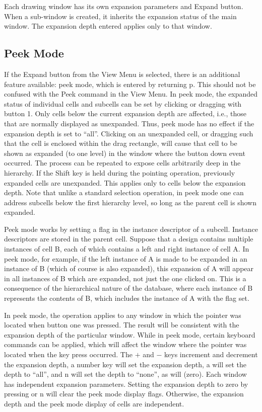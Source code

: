 Each drawing window has its own expansion parameters and {\cb Expand}
button.  When a sub-window is created, it inherits the expansion status
of the main window.  The expansion depth entered applies only to that
window. 

\subsection{Peek Mode}
If the {\cb Expand} button from the {\cb View Menu} is selected, there
is an additional feature available:  peek mode, which is entered by
returning {\et p}.  This should not be confused with the {\cb Peek}
command in the {\cb View Menu}.  In peek mode, the expanded status of
individual cells and subcells can be set by clicking or dragging with
button 1.  Only cells below the current expansion depth are affected,
i.e., those that are normally displayed as unexpanded.  Thus, peek
mode has no effect if the expansion depth is set to ``all''.  Clicking
on an unexpanded cell, or dragging such that the cell is enclosed
within the drag rectangle, will cause that cell to be shown as
expanded (to one level) in the window where the button down event
occurred.  The process can be repeated to expose cells arbitrarily
deep in the hierarchy.  If the {\kb Shift} key is held during the
pointing operation, previously expanded cells are unexpanded.  This
applies only to cells below the expansion depth.  Note that unlike a
standard selection operation, in peek mode one can address subcells
below the first hierarchy level, so long as the parent cell is shown
expanded.

Peek mode works by setting a flag in the instance descriptor of a
subcell.  Instance descriptors are stored in the parent cell.  Suppose
that a design contains multiple instances of cell B, each of which
contains a left and right instance of cell A.  In peek mode, for
example, if the left instance of A is made to be expanded in an
instance of B (which of course is also expanded), this expansion of A
will appear in all instances of B which are expanded, not just the one
clicked on.  This is a consequence of the hierarchical nature of the
database, where each instance of B represents the contents of B, which
includes the instance of A with the flag set.

In peek mode, the operation applies to any window in which the pointer
was located when button one was pressed.  The result will be
consistent with the expansion depth of the particular window.  While
in peek mode, certain keyboard commands can be applied, which will
affect the window where the pointer was located when the key press
occurred.  The {\kb $+$} and {\kb $-$} keys increment and decrement
the expansion depth, a number key will set the expansion depth, {\kb
a} will set the depth to ``all'', and {\kb n} will set the depth to
``none'', as will {} (zero).  Each window has independent
expansion parameters.  Setting the expansion depth to zero by pressing
{} or {\kb n} will clear the peek mode display flags.  Otherwise,
the expansion depth and the peek mode display of cells are
independent.

